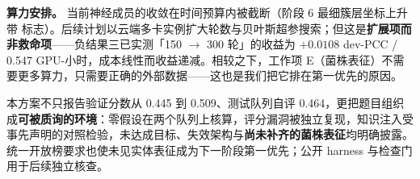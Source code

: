 \textbf{算力安排。} 当前神经成员的收敛在时间预算内被截断（阶段 6 最细簇层坐标上升带  标志）。后续计划以云端多卡实例扩大轮数与贝叶斯超参搜索；但这是\textbf{扩展项而非救命项}——负结果三已实测「150 $\to$ 300 轮」的收益为 $+0.0108$ dev-PCC / 0.547 GPU-小时，成本线性而收益递减。相较之下，工作项 E（菌株表征）不需要更多算力，只需要正确的外部数据——这也是我们把它排在第一优先的原因。

\begin{keybox}[title=结语]
\footnotesize
本方案不只报告验证分数从 0.445 到 0.509、测试队列自评 0.464，更把题目组织成\textbf{可被质询的环境}：零假设在两个队列上核算，评分漏洞被独立复现，知识注入受事先声明的对照检验，未达成目标、失效架构与\textbf{尚未补齐的菌株表征}均明确披露。统一开放榜要求也使未见实体表征成为下一阶段第一优先；公开 harness 与检查门用于后续独立核查。
\end{keybox}
